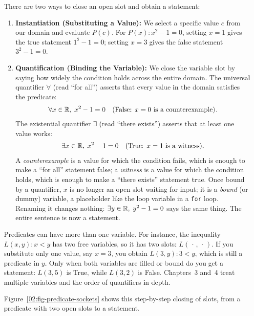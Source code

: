 There are two ways to close an open slot and obtain a statement:
\begin{enumerate}
\item \textbf{Instantiation (Substituting a Value):} We select a specific value $c$ from our domain and evaluate $P(c)$. For $P(x) : x^2 - 1 = 0$, setting $x = 1$ gives the true statement $1^2 - 1 = 0$; setting $x = 3$ gives the false statement $3^2 - 1 = 0$.
\item \textbf{Quantification (Binding the Variable):} We close the variable slot by saying how widely the condition holds across the entire domain. The universal quantifier $\forall$ (read ``for all'') asserts that every value in the domain satisfies the predicate:
\[
\forall x \in \mathbb{R},\; x^2 - 1 = 0 \quad (\text{False: } x = 0 \text{ is a counterexample}).
\]
The existential quantifier $\exists$ (read ``there exists'') asserts that at least one value works:
\[
\exists x \in \mathbb{R},\; x^2 - 1 = 0 \quad (\text{True: } x = 1 \text{ is a witness}).
\]
A \emph{counterexample} is a value for which the condition fails, which is enough to make a ``for all'' statement false; a \emph{witness} is a value for which the condition holds, which is enough to make a ``there exists'' statement true. Once bound by a quantifier, $x$ is no longer an open slot waiting for input; it is a \emph{bound} (or dummy) variable, a placeholder like the loop variable in a \texttt{for} loop. Renaming it changes nothing: $\exists y \in \mathbb{R},\; y^2 - 1 = 0$ says the same thing. The entire sentence is now a statement.
\end{enumerate}

Predicates can have more than one variable. For instance, the inequality $L(x, y) : x < y$ has two free variables, so it has two slots: $L(\,\cdot\,, \,\cdot\,)$. If you substitute only one value, say $x = 3$, you obtain $L(3, y) : 3 < y$, which is still a predicate in $y$. Only when both variables are filled or bound do you get a statement: $L(3, 5)$ is True, while $L(3, 2)$ is False. Chapters~3 and~4 treat multiple variables and the order of quantifiers in depth.

Figure~\ref{02:fig-predicate-sockets} shows this step-by-step closing of slots, from a predicate with two open slots to a statement.


